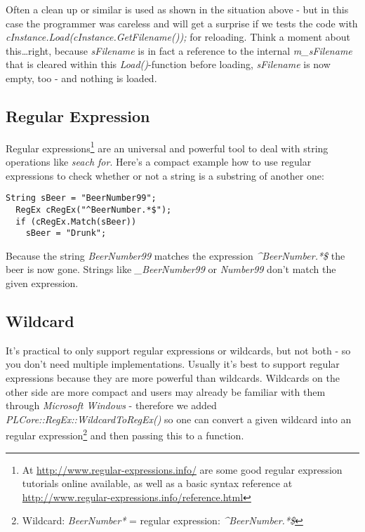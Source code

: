 Often a clean up or similar is used as shown in the situation above - but in this case the programmer was careless and will get a surprise if we tests the code with \emph{cInstance.Load(cInstance.GetFilename());} for reloading. Think a moment about this\ldots right, because \emph{sFilename} is in fact a reference to the internal \emph{m\_sFilename} that is cleared within this \emph{Load()}-function before loading, \emph{sFilename} is now empty, too - and nothing is loaded.




\subsection{Regular Expression}
Regular expressions\footnote{At \url{http://www.regular-expressions.info/} are some good regular expression tutorials online available, as well as a basic syntax reference at \url{http://www.regular-expressions.info/reference.html}} are an universal and powerful tool to deal with string operations like \emph{seach for}. Here's a compact example how to use regular expressions to check whether or not a string is a substring of another one:

\begin{lstlisting}[caption=Regular expression example]
  String sBeer = "BeerNumber99";
  RegEx cRegEx("^BeerNumber.*$");
  if (cRegEx.Match(sBeer))
    sBeer = "Drunk";
\end{lstlisting}

Because the string \emph{BeerNumber99} matches the expression \emph{\textasciicircum BeerNumber.*\$} the beer is now gone. Strings like \emph{\_BeerNumber99} or \emph{Number99} don't match the given expression.




\subsection{Wildcard}
It's practical to only support regular expressions or wildcards, but not both - so you don't need multiple implementations. Usually it's best to support regular expressions because they are more powerful than wildcards. Wildcards on the other side are more compact and users may already be familiar with them through \emph{Microsoft Windows} - therefore we added \emph{PLCore::RegEx::WildcardToRegEx()} so one can convert a given wildcard into an regular expression\footnote{Wildcard: \emph{BeerNumber*} = regular expression: \emph{\textasciicircum BeerNumber.*\$}} and then passing this to a function.




